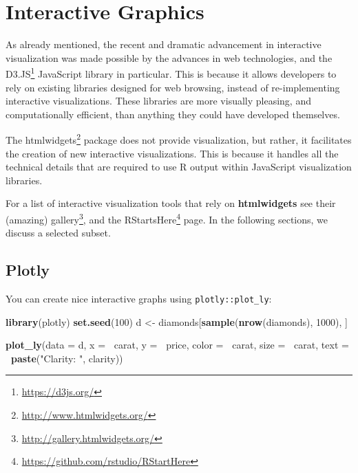 \documentclass[]{book}
\newenvironment{Shaded}{\begin{snugshade}}{\end{snugshade}}
\newcommand{\DataTypeTok}[1]{\textcolor[rgb]{0.13,0.29,0.53}{#1}}
\newcommand{\DecValTok}[1]{\textcolor[rgb]{0.00,0.00,0.81}{#1}}
\newcommand{\KeywordTok}[1]{\textcolor[rgb]{0.13,0.29,0.53}{\textbf{#1}}}
\newcommand{\NormalTok}[1]{#1}
\newcommand{\OperatorTok}[1]{\textcolor[rgb]{0.81,0.36,0.00}{\textbf{#1}}}
\newcommand{\StringTok}[1]{\textcolor[rgb]{0.31,0.60,0.02}{#1}}
\renewcommand{\href}[2]{#2\footnote{\url{#1}}}
\theoremstyle{definition}
\theoremstyle{definition}
\theoremstyle{definition}
\theoremstyle{remark}
\begin{document}
\hypertarget{interactive-graphics}{%
\section{Interactive Graphics}\label{interactive-graphics}}

As already mentioned, the recent and dramatic advancement in interactive visualization was made possible by the advances in web technologies, and the \href{https://d3js.org/}{D3.JS} JavaScript library in particular.
This is because it allows developers to rely on existing libraries designed for web browsing, instead of re-implementing interactive visualizations.
These libraries are more visually pleasing, and computationally efficient, than anything they could have developed themselves.

The \href{http://www.htmlwidgets.org/}{htmlwidgets} package does not provide visualization, but rather, it facilitates the creation of new interactive visualizations.
This is because it handles all the technical details that are required to use R output within JavaScript visualization libraries.

For a list of interactive visualization tools that rely on \textbf{htmlwidgets} see \href{http://gallery.htmlwidgets.org/}{their (amazing) gallery}, and the \href{https://github.com/rstudio/RStartHere}{RStartsHere} page.
In the following sections, we discuss a selected subset.

\hypertarget{plotly}{%
\subsection{Plotly}\label{plotly}}

You can create nice interactive graphs using \texttt{plotly::plot\_ly}:

\begin{Shaded}
\begin{Highlighting}[]
\KeywordTok{library}\NormalTok{(plotly)}
\KeywordTok{set.seed}\NormalTok{(}\DecValTok{100}\NormalTok{)}
\NormalTok{d <-}\StringTok{ }\NormalTok{diamonds[}\KeywordTok{sample}\NormalTok{(}\KeywordTok{nrow}\NormalTok{(diamonds), }\DecValTok{1000}\NormalTok{), ]}
\end{Highlighting}
\end{Shaded}

\begin{Shaded}
\begin{Highlighting}[]
\KeywordTok{plot_ly}\NormalTok{(}\DataTypeTok{data =}\NormalTok{ d, }\DataTypeTok{x =} \OperatorTok{~}\NormalTok{carat, }\DataTypeTok{y =} \OperatorTok{~}\NormalTok{price, }\DataTypeTok{color =} \OperatorTok{~}\NormalTok{carat, }\DataTypeTok{size =} \OperatorTok{~}\NormalTok{carat, }\DataTypeTok{text =} \OperatorTok{~}\KeywordTok{paste}\NormalTok{(}\StringTok{"Clarity: "}\NormalTok{, clarity))}
\end{Highlighting}
\end{Shaded}
\end{document}
